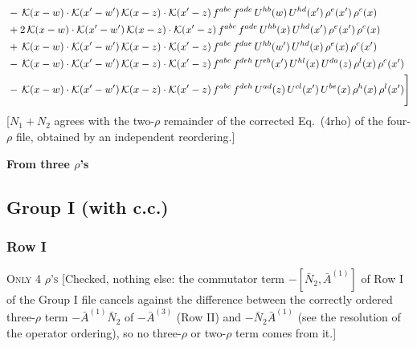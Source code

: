 \documentclass[9pt]{article}
\numberwithin{equation}{section}
\begin{document}
\begin{align}
&-\,\mathcal{K}(x-w)\cdot\mathcal{K}(x'-w')\,\mathcal{K}(x-z)\cdot\mathcal{K}(x'-z)\,f^{abc}\,f^{ade}\,U^{hb}(w)\,U^{hd}(x')\,\rho^{e}(x')\,\rho^{c}(x)\notag\\
&+2\,\mathcal{K}(x-w)\cdot\mathcal{K}(x'-w')\,\mathcal{K}(x-z)\cdot\mathcal{K}(x'-z)\,f^{abc}\,f^{ade}\,U^{hb}(x)\,U^{hd}(x')\,\rho^{e}(x')\,\rho^{c}(x)\notag\\
&+\,\mathcal{K}(x-w)\cdot\mathcal{K}(x'-w')\,\mathcal{K}(x-z)\cdot\mathcal{K}(x'-z)\,f^{abc}\,f^{dae}\,U^{hb}(w')\,U^{hd}(x)\,\rho^{e}(x)\,\rho^{c}(x')\notag\\
&-\,\mathcal{K}(x-w)\cdot\mathcal{K}(x'-w')\,\mathcal{K}(x-z)\cdot\mathcal{K}(x'-z)\,f^{abc}\,f^{deh}\,U^{eb}(x')\,U^{hl}(x)\,U^{da}(z)\,\rho^{l}(x)\,\rho^{c}(x')\notag\\
&-\,\mathcal{K}(x-w)\cdot\mathcal{K}(x'-w')\,\mathcal{K}(x-z)\cdot\mathcal{K}(x'-z)\,f^{abc}\,f^{deh}\,U^{ad}(z)\,U^{cl}(x')\,U^{be}(x)\,\rho^{h}(x)\,\rho^{l}(x')\Bigg]
\end{align} {\color{red}[$N_{1}+N_{2}$ agrees with the two-$\rho$ remainder of the corrected Eq.~(4rho) of the four-$\rho$ file, obtained by an independent reordering.]}\par\noindent
\textbf{From three $\rho$'s}
\subsection{Group I (with c.c.)}
\subsubsection{Row I}
\textsc{Only 4 $\rho$'s} {\color{red}[Checked, nothing else: the commutator term $-[\bar N_{2},\bar A^{(1)}]$ of Row I of the Group I file cancels against the difference between the correctly ordered three-$\rho$ term $-\bar A^{(1)}\bar N_{2}$ of $-\bar A^{(3)}$ (Row II) and $-\bar N_{2}\bar A^{(1)}$ (see the resolution of the operator ordering), so no three-$\rho$ or two-$\rho$ term comes from it.]}
\end{document}
